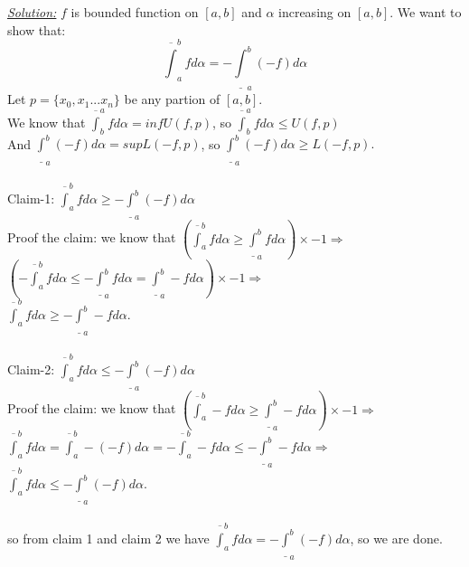 \documentclass{book}
\begin{document}
\begin{tcolorbox}[enhanced,attach boxed title to top center={yshift=-3mm,yshifttext=-1mm},
colback=blue!5!white,colframe=blue!75!black,colbacktitle=red!80!black,
title=Exercise 51.5:,fonttitle=\bfseries,
boxed title style={size=small,colframe=red!50!black} ]
\textit{\color{blue}\underline{Solution:}}
$f$ is bounded function on $[a,b]$ and $\alpha$ increasing on $[a,b]$. We want to show that:
$$\overline{\int}_a^b f d\alpha=-\underline{\int}_a^b (-f)d\alpha$$
Let $p=\{x_0,x_1...x_n\}$ be any partion of $[a,b]$.\\
We know that $\overline{\int}^a_b f d\alpha=inf U(f,p)$, so $\overline{\int}^a_b f d\alpha \leq U(f,p)$\\
And $\underline{\int}_a^b (-f)d\alpha=sup L(-f,p)$, so $\underline{\int}_a^b (-f)d\alpha\geq L(-f,p).$\\
\noindent{\color{blue}\rule{\linewidth}{.3mm}}\\
{\color{red}Claim-1:} $\overline{\int}_a^b f d\alpha\geq -\underline{\int}_a^b (-f)d\alpha$\\
{\color{red}Proof the claim:} we know that $\left( \overline{\int}_a^b f d\alpha\geq\underline{\int}_a^b fd\alpha\right)\times -1\Rightarrow$\\
$\left( -\overline{\int}_a^b f d\alpha\leq-\underline{\int}_a^b fd\alpha=\underline{\int}_a^b -fd\alpha\right)\times -1\Rightarrow$\\
$\overline{\int}_a^b f d\alpha\geq-\underline{\int}_a^b -fd\alpha.$\\
\noindent{\color{blue}\rule{\linewidth}{.3mm}}\\
{\color{red}Claim-2:} $\overline{\int}_a^b f d\alpha\leq -\underline{\int}_a^b (-f)d\alpha$\\
{\color{red}Proof the claim:} we know that $\left( \overline{\int}_a^b -f d\alpha\geq\underline{\int}_a^b -fd\alpha\right)\times -1\Rightarrow$\\
$\overline{\int}_a^b f d\alpha =\overline{\int}_a^b -(-f) d\alpha=-\overline{\int}_a^b -f d\alpha\leq-\underline{\int}_a^b -fd\alpha\Rightarrow$\\
$\overline{\int}_a^b f d\alpha\leq -\underline{\int}_a^b (-f)d\alpha.$\\
\noindent{\color{blue}\rule{\linewidth}{.3mm}}\\
so from claim 1 and claim 2 we have $\overline{\int}_a^b f d\alpha=-\underline{\int}_a^b (-f)d\alpha$, so we are done.
\end{tcolorbox}
\end{document}
